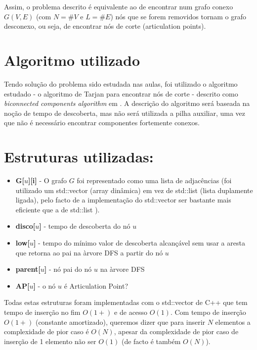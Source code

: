 \documentclass{scrartcl}
\begin{document}
Assim, o problema descrito é equivalente ao de encontrar num grafo conexo $G(V,E)$ (com $N = \#V$ e $L = \#E$) nós que se forem removidos tornam o grafo desconexo, ou seja, de encontrar nós de corte (articulation points).

\section*{Algoritmo utilizado}
Tendo solução do problema sido estudada nas aulas, foi utilizado o algoritmo estudado - o algoritmo de Tarjan para encontrar nós de corte - descrito como \textit{biconnected components algorithm} em \cite{Hopcroft:EAGM}. A descrição do algoritmo será baseada na noção de tempo de descoberta, mas não será utilizada a pilha auxiliar, uma vez que não é necessário encontrar componentes fortemente conexos.

\section*{Estruturas utilizadas:}
\begin{itemize}
\setlength\itemsep{-0.5ex}
\item \textbf{G[$u$][i]} - O grafo $G$ foi representado como uma lista de adjacências (foi utilizado um std::vector (array dinâmica) em vez de std::list (lista duplamente ligada), pelo facto de a implementação do std::vector ser bastante mais eficiente que a de std::list \cite{ISOC++:2003}).
\item \textbf{disco[$u$]} - tempo de descoberta do nó $u$
\item \textbf{low[$u$]} - tempo do mínimo valor de descoberta alcançável sem usar a aresta que retorna ao pai na àrvore DFS a partir do nó $u$
\item \textbf{parent[$u$]} - nó pai do nó $u$ na àrvore DFS
\item \textbf{AP[$u$]} - o nó $u$ é Articulation Point?
\end{itemize}
Todas estas estruturas foram implementadas com o std::vector de C++ que tem tempo de inserção no fim $O(1+)$ e de acesso $O(1)$. Com tempo de inserção $O(1+)$ (constante amortizado), queremos dizer que para inserir $N$ elementos a complexidade de pior caso é $O(N)$, apesar da complexidade de pior caso de inserção de 1 elemento não ser $O(1)$ (de facto é também $O(N)$). \cite{ISOC++:2003}
\end{document}
